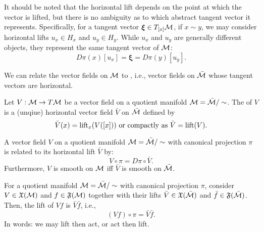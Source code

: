 \documentclass[11pt,a4paper]{article}
\begin{document}
\begin{remark}
It should be noted that the horizontal lift depends on the point at which the vector is lifted, but there is no ambiguity as to which abstract tangent vector it represents. Specifically, for a tangent vector $\boldsymbol\xi\in T_{[x]}\mathcal{M}$, if $x\sim y$, we may consider horizontal lifts $u_x\in H_x$ and $u_y\in H_y$. While $u_x$ and $u_y$ are generally different objects, they represent the same tangent vector of $\mathcal{M}$:
\begin{equation*}
    D\pi(x)[u_x] = \boldsymbol\xi = D\pi(y)[u_y].
\end{equation*}
\end{remark}

We can relate the vector fields on $\mathcal{M}$ to , i.e., vector fields on $\bar{\mathcal{M}}$ whose tangent vectors are horizontal.

\begin{mydef}
Let $V:\mathcal{M}\rightarrow T\mathcal{M}$ be a vector field on a quotient manifold $\mathcal{M} = \bar{\mathcal{M}}/\sim$. The  of $V$ is a (unqiue) horizontal vector field $\bar{V}$ on $\bar{\mathcal{M}}$ defined by 
\begin{equation*}
\bar{V}(x) = \text{lift}_x(V([x]))\text{ or compactly as } \bar{V} = \text{lift}(V).
\end{equation*}
\end{mydef}

\begin{prop}
A vector field $V$ on a quotient manifold $\mathcal{M} = \bar{\mathcal{M}}/\sim$ with canonical projection $\pi$ is related to its horizontal lift $\bar{V}$ by:
\begin{equation*}
V\circ \pi = D\pi\circ \bar{V}.
\end{equation*}
Furthermore, $V$ is smooth on $\mathcal{M}$ iff $\bar{V}$ is smooth on $\bar{\mathcal{M}}$.
\end{prop}

\begin{prop}
For a quotient manifold $\mathcal{M} = \bar{\mathcal{M}}/\sim$ with canonical projection $\pi$, consider $V\in \mathfrak{X}(\mathcal{M})$ and $f\in\mathfrak{F}(\mathcal{M})$ together with their lifts $\bar{V}\in\mathfrak{X}(\bar{\mathcal{M}})$ and $\bar{f}\in\mathfrak{F}(\bar{\mathcal{M}})$. Then, the lift of $Vf$ is $\bar{V}\bar{f}$, i.e., 
\begin{equation*}
(Vf)\circ \pi = \bar{V}\bar{f}.
\end{equation*}
In words: we may lift then act, or act then lift.
\end{prop}
\end{document}
